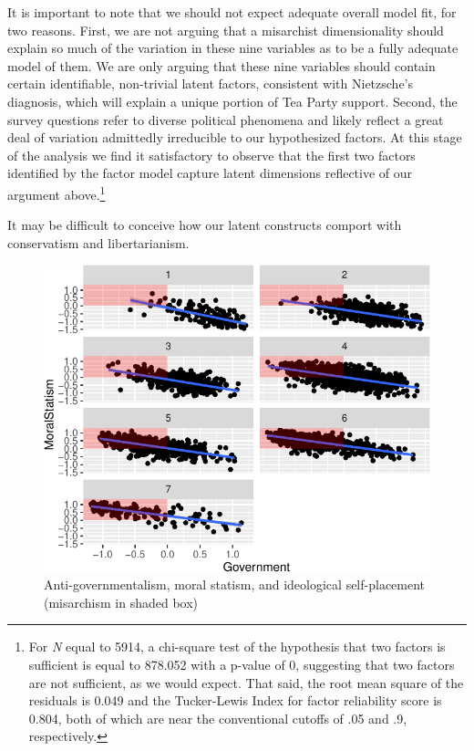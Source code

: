 \documentclass[12pt,]{article}
\let\rmarkdownfootnote\footnote%
\def\footnote{\protect\rmarkdownfootnote}
\begin{document}
It is important to note that we should not expect adequate overall model
fit, for two reasons. First, we are not arguing that a misarchist
dimensionality should explain so much of the variation in these nine
variables as to be a fully adequate model of them. We are only arguing
that these nine variables should contain certain identifiable,
non-trivial latent factors, consistent with Nietzsche's diagnosis, which
will explain a unique portion of Tea Party support. Second, the survey
questions refer to diverse political phenomena and likely reflect a
great deal of variation admittedly irreducible to our hypothesized
factors. At this stage of the analysis we find it satisfactory to
observe that the first two factors identified by the factor model
capture latent dimensions reflective of our argument above.\footnote{For
  \emph{N} equal to 5914, a chi-square test of the hypothesis that two
  factors is sufficient is equal to 878.052 with a p-value of 0,
  suggesting that two factors are not sufficient, as we would expect.
  That said, the root mean square of the residuals is 0.049 and the
  Tucker-Lewis Index for factor reliability score is 0.804, both of
  which are near the conventional cutoffs of .05 and .9, respectively.}

It may be difficult to conceive how our latent constructs comport with
conservatism and libertarianism.

\begin{figure}[htbp]
\centering
\includegraphics{figures/exploratoryplot-1.pdf}
\caption{Anti-governmentalism, moral statism, and ideological
self-placement (misarchism in shaded box)}
\end{figure}
\end{document}
